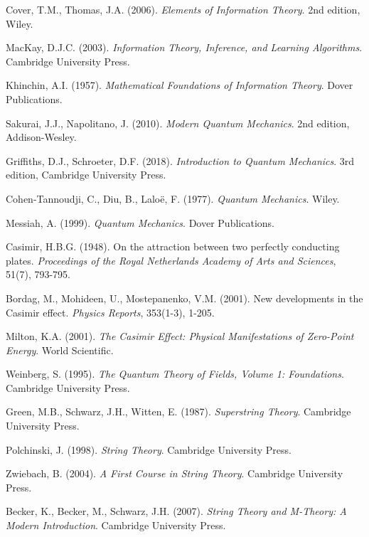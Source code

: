 \documentclass[12pt]{article}
\theoremstyle{plain}
\theoremstyle{definition}
\begin{document}
\begin{thebibliography}{99}
 Cover, T.M., Thomas, J.A. (2006). \emph{Elements of Information Theory}. 2nd edition, Wiley.

 MacKay, D.J.C. (2003). \emph{Information Theory, Inference, and Learning Algorithms}. Cambridge University Press.

 Khinchin, A.I. (1957). \emph{Mathematical Foundations of Information Theory}. Dover Publications.

 Sakurai, J.J., Napolitano, J. (2010). \emph{Modern Quantum Mechanics}. 2nd edition, Addison-Wesley.

 Griffiths, D.J., Schroeter, D.F. (2018). \emph{Introduction to Quantum Mechanics}. 3rd edition, Cambridge University Press.

 Cohen-Tannoudji, C., Diu, B., Laloë, F. (1977). \emph{Quantum Mechanics}. Wiley.

 Messiah, A. (1999). \emph{Quantum Mechanics}. Dover Publications.

 Casimir, H.B.G. (1948). On the attraction between two perfectly conducting plates. \emph{Proceedings of the Royal Netherlands Academy of Arts and Sciences}, 51(7), 793-795.

 Bordag, M., Mohideen, U., Mostepanenko, V.M. (2001). New developments in the Casimir effect. \emph{Physics Reports}, 353(1-3), 1-205.

 Milton, K.A. (2001). \emph{The Casimir Effect: Physical Manifestations of Zero-Point Energy}. World Scientific.

 Weinberg, S. (1995). \emph{The Quantum Theory of Fields, Volume 1: Foundations}. Cambridge University Press.

 Green, M.B., Schwarz, J.H., Witten, E. (1987). \emph{Superstring Theory}. Cambridge University Press.

 Polchinski, J. (1998). \emph{String Theory}. Cambridge University Press.

 Zwiebach, B. (2004). \emph{A First Course in String Theory}. Cambridge University Press.

 Becker, K., Becker, M., Schwarz, J.H. (2007). \emph{String Theory and M-Theory: A Modern Introduction}. Cambridge University Press.


\end{thebibliography}
\end{document}
